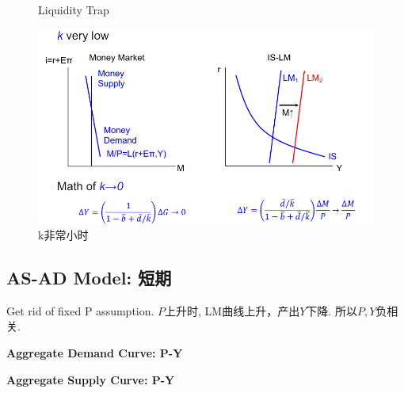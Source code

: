 \documentclass[UTF8, onecolumn, a4paper, 12pt]{article}
\begin{document}
\begin{center}
\begin{figure}[htb]
\begin{minipage}[b]{\linewidth}
{\begin{minipage}[b]{0.5\linewidth}
					\caption{Liquidity Trap}
					\vspace{8pt}
					\includegraphics[width=\linewidth]{k_low}
					\caption{k非常小时}
				\end{minipage}
			}
		\end{minipage}
	\end{figure}
\end{center}
\subsection{AS-AD Model: 短期}
Get rid of fixed P assumption. $P$上升时, LM曲线上升，产出$Y$下降. 所以$P, Y$负相关.

\textbf{Aggregate Demand Curve: P-Y}

\textbf{Aggregate Supply Curve: P-Y}
\end{document}
